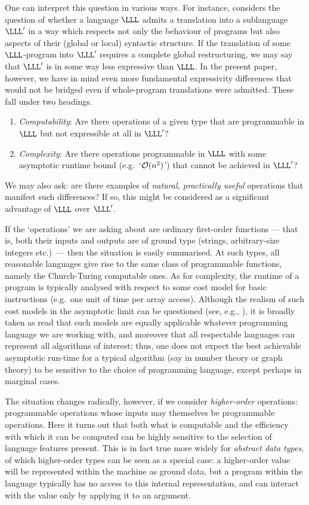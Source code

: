 \documentclass[12pt,phd,lfcs,twoside,openright,logo,leftchapter,normalheadings]{infthesis}
\theoremstyle{plain}
\theoremstyle{definition}
\begin{document}
One can interpret this question in various ways.  For instance,
\citet{Felleisen91} considers the question of whether a language
$\LLL$ admits a translation into a sublanguage $\LLL'$ in a way which
respects not only the behaviour of programs but also aspects of their
(global or local) syntactic structure. If the translation of some
$\LLL$-program into $\LLL'$ requires a complete global restructuring,
we may say that $\LLL'$ is in some way less expressive than $\LLL$.
In the present paper, however, we have in mind even more fundamental
expressivity differences that would not be bridged even if
whole-program translations were admitted. These fall under two
headings.
%
\begin{enumerate}
\item \emph{Computability}: Are there operations of a given type
  that are programmable in $\LLL$ but not expressible at all in $\LLL'$?
\item \emph{Complexity}: Are there operations programmable in $\LLL$
  with some asymptotic runtime bound (e.g.\ `$\mathcal{O}(n^2)$') that cannot be
  achieved in $\LLL'$?
\end{enumerate}
%
We may also ask: are there examples of \emph{natural, practically
  useful} operations that manifest such differences?  If so, this
might be considered as a significant advantage of $\LLL$ over $\LLL'$.

If the `operations' we are asking about are ordinary first-order
functions --- that is, both their inputs and outputs are of ground
type (strings, arbitrary-size integers etc.)\ --- then the situation
is easily summarised.  At such types, all reasonable languages give
rise to the same class of programmable functions, namely the
Church-Turing computable ones.  As for complexity, the runtime of a
program is typically analysed with respect to some cost model for
basic instructions (e.g.\ one unit of time per array access).
Although the realism of such cost models in the asymptotic limit can
be questioned (see, e.g., \citep[Section~2.6]{Knuth97}), it is broadly
taken as read that such models are equally applicable whatever
programming language we are working with, and moreover that all
respectable languages can represent all algorithms of interest; thus,
one does not expect the best achievable asymptotic run-time for a
typical algorithm (say in number theory or graph theory) to be
sensitive to the choice of programming language, except perhaps in
marginal cases.

The situation changes radically, however, if we consider
\emph{higher-order} operations: programmable operations whose inputs
may themselves be programmable operations.  Here it turns out that
both what is computable and the efficiency with which it can be
computed can be highly sensitive to the selection of language features
present. This is in fact true more widely for \emph{abstract data
  types}, of which higher-order types can be seen as a special case: a
higher-order value will be represented within the machine as ground
data, but a program within the language typically has no access to
this internal representation, and can interact with the value only by
applying it to an argument.
\end{document}
